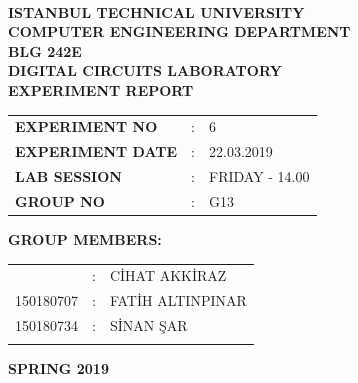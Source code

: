 \documentclass[pdftex,12pt,a4paper]{article}
\begin{document}
\begin{titlepage}
\begin{center}
\textbf{}\\
\textbf{\Large{ISTANBUL TECHNICAL UNIVERSITY}}\\
\vspace{0.5cm}
\textbf{\Large{COMPUTER ENGINEERING DEPARTMENT}}\\
\vspace{2cm}
\textbf{\Large{BLG 242E\\ DIGITAL CIRCUITS LABORATORY\\ EXPERIMENT REPORT}}\\
\vspace{2.8cm}
\begin{table}[ht]
\centering
\Large{
\begin{tabular}{lcl}
\textbf{EXPERIMENT NO}  & : & 6 \\
\textbf{EXPERIMENT DATE}  & : & 22.03.2019 \\
\textbf{LAB SESSION}  & : & FRIDAY - 14.00 \\
\textbf{GROUP NO}  & : & G13 \\
\end{tabular}}
\end{table}
\vspace{1cm}
\textbf{\Large{GROUP MEMBERS:}}\\
\begin{table}[ht]
\centering
\Large{
\begin{tabular}{rcl}
{
150180704  & : & C\.{I}HAT AKK\.{I}RAZ \\
150180707  & : & FAT\.{I}H ALTINPINAR \\
150180734  & : & S\.{I}NAN \c{S}AR \\
}
\end{tabular}}
\end{table}
\vspace{2.8cm}
\textbf{\Large{SPRING 2019}}

\end{center}

\end{titlepage}

\newpage
\newpage

\thispagestyle{empty}
\setcounter{tocdepth}{4}
\tableofcontents
\clearpage
\end{document}
